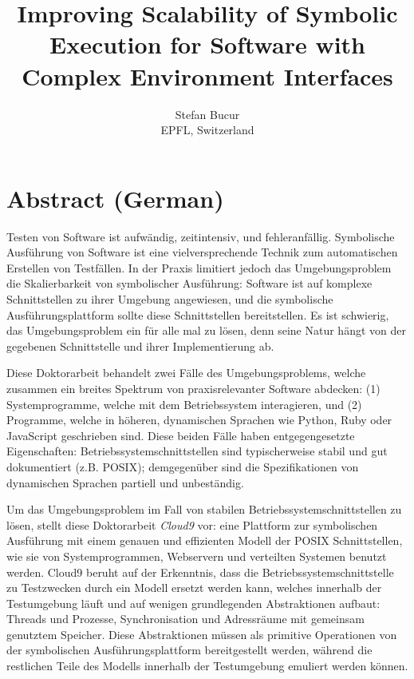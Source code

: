 \documentclass[letterpaper,10pt,oneside]{book}
\newcommand{\thesistitle}{Improving Scalability of Symbolic Execution for Software with Complex Environment Interfaces}
\newcommand{\cnine}{Cloud9\xspace}
\begin{document}
\date{}
\title{\thesistitle}
\author{Stefan Bucur \\ EPFL, Switzerland}

\maketitle

\chapter*{Abstract (German)}

Testen von Software ist aufwändig, zeitintensiv, und fehleranfällig. Symbolische Ausführung von Software ist eine vielversprechende Technik zum automatischen Erstellen von Testfällen. In der Praxis limitiert jedoch das Umgebungsproblem die Skalierbarkeit von symbolischer Ausführung: Software ist auf komplexe Schnittstellen zu ihrer Umgebung angewiesen, und die symbolische Ausführungsplattform sollte diese Schnittstellen bereitstellen. Es ist schwierig, das Umgebungsproblem ein für alle mal zu lösen, denn seine Natur hängt von der gegebenen Schnittstelle und ihrer Implementierung ab.

Diese Doktorarbeit behandelt zwei Fälle des Umgebungsproblems, welche zusammen ein breites Spektrum von praxisrelevanter Software abdecken: (1) Systemprogramme, welche mit dem Betriebssystem interagieren, und (2) Programme, welche in höheren, dynamischen Sprachen wie Python, Ruby oder JavaScript geschrieben sind. Diese beiden Fälle haben entgegengesetzte Eigenschaften: Betriebssystemschnittstellen sind typischerweise stabil und gut dokumentiert (z.B. POSIX); demgegenüber sind die Spezifikationen von dynamischen Sprachen partiell und unbeständig.

Um das Umgebungsproblem im Fall von stabilen Betriebssystemschnittstellen zu lösen, stellt diese Doktorarbeit \emph{\cnine} vor: eine Plattform zur symbolischen Ausführung mit einem genauen und effizienten Modell der POSIX Schnittstellen, wie sie von Systemprogrammen, Webservern und verteilten Systemen benutzt werden. \cnine beruht auf der Erkenntnis, dass die Betriebssystemschnittstelle zu Testzwecken durch ein Modell ersetzt werden kann, welches innerhalb der Testumgebung läuft und auf wenigen grundlegenden Abstraktionen aufbaut: Threads und Prozesse, Synchronisation und Adressräume mit gemeinsam genutztem Speicher. Diese Abstraktionen müssen als primitive Operationen von der symbolischen Ausführungsplattform bereitgestellt werden, während die restlichen Teile des Modells innerhalb der Testumgebung emuliert werden können.
\end{document}
